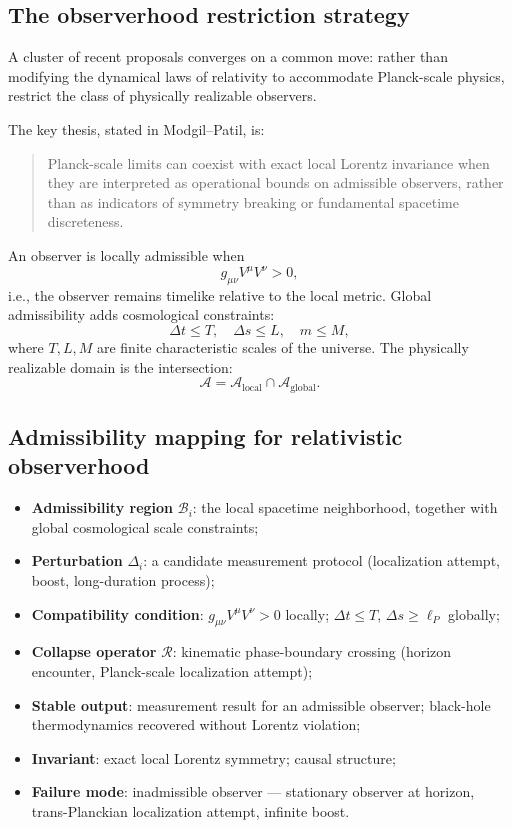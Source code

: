 \documentclass[12pt, a4paper]{article}
\theoremstyle{plain}
\theoremstyle{definition}
\theoremstyle{remark}
\newcommand{\Rcal}{\mathcal{R}}
\newcommand{\Bcal}{\mathcal{B}}
\begin{document}
\subsection{The observerhood restriction strategy}

A cluster of recent proposals converges on a common move: rather than
modifying the dynamical laws of relativity to accommodate Planck-scale
physics, restrict the class of physically realizable observers.

The key thesis, stated in Modgil--Patil, is:
\begin{quote}
  Planck-scale limits can coexist with exact local Lorentz invariance
  when they are interpreted as operational bounds on admissible
  observers, rather than as indicators of symmetry breaking or
  fundamental spacetime discreteness.
\end{quote}

An observer is locally admissible when
\[
  g_{\mu\nu}V^\mu V^\nu > 0,
\]
i.e., the observer remains timelike relative to the local metric.
Global admissibility adds cosmological constraints:
\[
  \Delta t \leq T, \quad \Delta s \leq L, \quad m \leq M,
\]
where $T, L, M$ are finite characteristic scales of the universe.
The physically realizable domain is the intersection:
\[
  \mathcal{A} = \mathcal{A}_{\mathrm{local}} \cap \mathcal{A}_{\mathrm{global}}.
\]

\subsection{Admissibility mapping for relativistic observerhood}

\begin{itemize}
  \item \textbf{Admissibility region} $\Bcal_i$: the local spacetime
        neighborhood, together with global cosmological scale
        constraints;
  \item \textbf{Perturbation} $\Delta_i$: a candidate measurement
        protocol (localization attempt, boost, long-duration process);
  \item \textbf{Compatibility condition}:
        $g_{\mu\nu}V^\mu V^\nu > 0$ locally;
        $\Delta t \leq T$, $\Delta s \geq \ell_P$ globally;
  \item \textbf{Collapse operator} $\Rcal$: kinematic phase-boundary
        crossing (horizon encounter, Planck-scale localization
        attempt);
  \item \textbf{Stable output}: measurement result for an admissible
        observer; black-hole thermodynamics recovered without Lorentz
        violation;
  \item \textbf{Invariant}: exact local Lorentz symmetry; causal
        structure;
  \item \textbf{Failure mode}: inadmissible observer --- stationary
        observer at horizon, trans-Planckian localization attempt,
        infinite boost.
\end{itemize}
\end{document}
